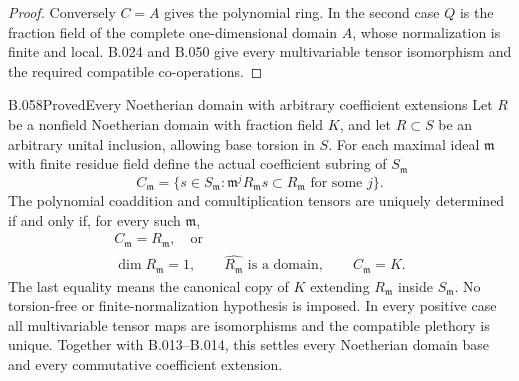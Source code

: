\begin{proof}
Conversely $C=A$ gives the polynomial ring. In
the second case $Q$ is the fraction field of
the complete one-dimensional domain $A$, whose
normalization is finite and local. B.024 and
B.050 give every multivariable tensor isomorphism
and the required compatible co-operations.
\end{proof}

\begin{saresult}{B.058}{Proved}{Every Noetherian domain with arbitrary coefficient extensions}
Let $R$ be a nonfield Noetherian domain with fraction
field $K$, and let $R\subset S$ be an arbitrary unital
inclusion, allowing base torsion in $S$. For each maximal
ideal $\mathfrak m$ with finite residue field define
the actual coefficient subring of $S_{\mathfrak m}$
\[
 C_{\mathfrak m}
   =\{s\in S_{\mathfrak m}:\mathfrak m^jR_{\mathfrak m}s
              \subset R_{\mathfrak m}\text{ for some }j\}.
\]
The polynomial coaddition and comultiplication tensors
are uniquely determined if and only if, for every such
$\mathfrak m$,
\[
\begin{gathered}
 C_{\mathfrak m}=R_{\mathfrak m},\quad\text{or}\\
 \dim R_{\mathfrak m}=1,\qquad
 \widehat{R_{\mathfrak m}}\text{ is a domain},\qquad
 C_{\mathfrak m}=K.                                      \tag{B58.1}
\end{gathered}
\]
The last equality means the canonical copy of $K$
extending $R_{\mathfrak m}$ inside $S_{\mathfrak m}$.
No torsion-free or finite-normalization hypothesis is
imposed. In every positive case all multivariable
tensor maps are isomorphisms and the compatible
plethory is unique. Together with B.013--B.014, this
settles every Noetherian domain base and every
commutative coefficient extension.
\end{saresult}
